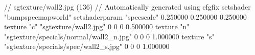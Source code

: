 // sgtexture/wall2.jpg (136)
// Automatically generated using cfgfix
setshader "bumpspecmapworld"
setshaderparam "specscale" 0.250000 0.250000 0.250000
texture "c" "sgtexture/wall2.jpg" 0 0 0 0.500000
texture "n" "sgtexture/specials/normal/wall2_n.jpg" 0 0 0 1.000000
texture "s" "sgtexture/specials/spec/wall2_s.jpg" 0 0 0 1.000000
